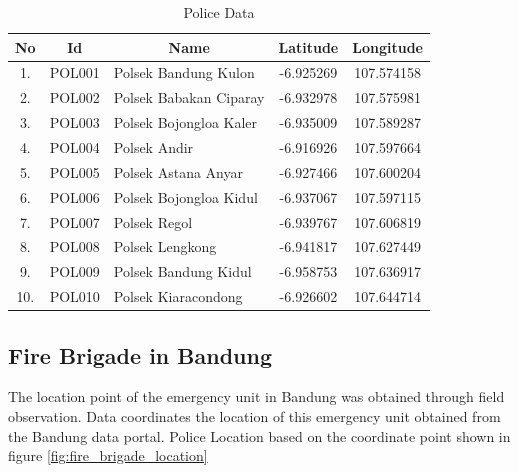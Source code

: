\begin{table}[H] 
\centering
\begin{tabular}{|c|c|c|c|c|}
\hline
\rowcolor{gray}
\textbf{No} & \textbf{Id} & \textbf{Name} & \textbf{Latitude} & \textbf{Longitude} \\
  \hline
1. & POL001 & \multicolumn{1}{|l|}{Polsek Bandung Kulon} & -6.925269 & 107.574158 \\
  \cline{1-5}
2. & POL002 & \multicolumn{1}{|l|}{Polsek Babakan Ciparay} & -6.932978 & 107.575981 \\
  \cline{1-5}
3. & POL003 & \multicolumn{1}{|l|}{Polsek Bojongloa Kaler} & -6.935009 & 107.589287 \\
  \cline{1-5}
4. & POL004 & \multicolumn{1}{|l|}{Polsek Andir} & -6.916926 & 107.597664 \\
  \cline{1-5}
5. & POL005 & \multicolumn{1}{|l|}{Polsek Astana Anyar} & -6.927466 & 107.600204 \\
  \cline{1-5}
6. & POL006 & \multicolumn{1}{|l|}{Polsek Bojongloa Kidul} & -6.937067 & 107.597115 \\
   \cline{1-5}
7. & POL007 & \multicolumn{1}{|l|}{Polsek Regol} & -6.939767 & 107.606819 \\
  \cline{1-5}
8. & POL008 & \multicolumn{1}{|l|}{Polsek Lengkong} & -6.941817 & 107.627449 \\
   \cline{1-5}
9. & POL009 & \multicolumn{1}{|l|}{Polsek Bandung Kidul} & -6.958753 & 107.636917  \\
   \cline{1-5}
10. & POL010 & \multicolumn{1}{|l|}{Polsek Kiaracondong} & -6.926602 & 107.644714 \\
  \hline
\end{tabular}
\caption{Police Data}
\label{table:police_data}
\end{table}


\subsection{Fire Brigade in Bandung}
The location point of the emergency unit in Bandung was obtained through field observation. Data coordinates the location of this emergency unit obtained from the Bandung data portal. Police Location based on the coordinate point shown in figure \ref{fig:fire_brigade_location}

